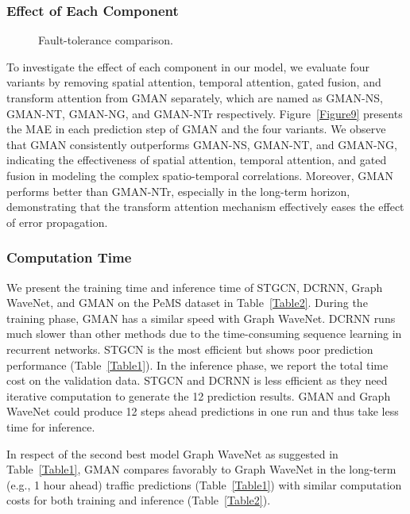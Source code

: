 \documentclass[letterpaper]{article} \usepackage{aaai20}  \usepackage{times}  \usepackage{helvet} \usepackage{courier}  \usepackage[hyphens]{url}  \usepackage{graphicx} \usepackage{amsmath}
\begin{document}
\subsubsection{Effect of Each Component}

\begin{figure}
	\centering
	\caption{Fault-tolerance comparison.}
	\label{Figure8} 
\end{figure}

To investigate the effect of each component in our model, we evaluate four variants by removing spatial attention, temporal attention, gated fusion, and transform attention from GMAN separately, which are named as GMAN-NS, GMAN-NT, GMAN-NG, and GMAN-NTr respectively. Figure~\ref{Figure9} presents the MAE in each prediction step of GMAN and the four variants. We observe that GMAN consistently outperforms GMAN-NS, GMAN-NT, and GMAN-NG, indicating the effectiveness of spatial attention, temporal attention, and gated fusion in modeling the complex spatio-temporal correlations. Moreover, GMAN performs better than GMAN-NTr, especially in the long-term horizon, demonstrating that the transform attention mechanism effectively eases the effect of error propagation.

\subsubsection{Computation Time}

We present the training time and inference time of STGCN, DCRNN, Graph WaveNet, and GMAN on the PeMS dataset in Table~\ref{Table2}. During the training phase, GMAN has a similar speed with Graph WaveNet. DCRNN runs much slower than other methods due to the time-consuming sequence learning in recurrent networks. STGCN is the most efficient but shows poor prediction performance (Table~\ref{Table1}). In the inference phase, we report the total time cost on the validation data. STGCN and DCRNN is less efficient as they need iterative computation to generate the 12 prediction results. GMAN and Graph WaveNet could produce 12 steps ahead predictions in one run and thus take less time for inference. 

In respect of the second best model Graph WaveNet as suggested in Table~\ref{Table1}, GMAN compares favorably to Graph WaveNet in the long-term (e.g., 1 hour ahead) traffic predictions (Table~\ref{Table1}) with similar computation costs for both training and inference (Table~\ref{Table2}). 
\end{document}
